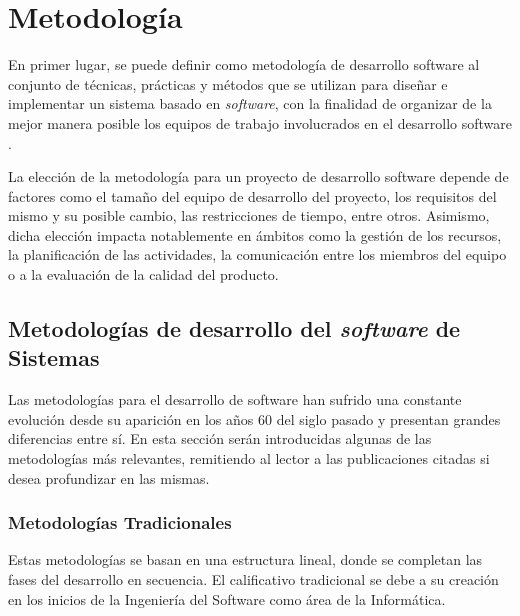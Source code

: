 \chapter{Metodología}
\label{chapter:metodologia}


En primer lugar, se puede definir como metodología de desarrollo software al conjunto de técnicas, prácticas y métodos que se utilizan para diseñar e implementar un sistema basado en \textit{software}, con la finalidad de organizar de la mejor manera posible los equipos de trabajo involucrados en el desarrollo software \cite{santander_universidades_metodologias_2020}.

La elección de la metodología para un proyecto de desarrollo software depende de factores como el tamaño del equipo de desarrollo del proyecto, los requisitos del mismo y su posible cambio, las restricciones de tiempo, entre otros. Asimismo, dicha elección impacta notablemente en ámbitos como la gestión de los recursos, la planificación de las actividades, la comunicación entre los miembros del equipo o a la evaluación de la calidad del producto.

\section{Metodologías de desarrollo del \textit{software} de Sistemas}

    Las metodologías para el desarrollo de software han sufrido una constante evolución desde su aparición en los años 60 del siglo pasado y presentan grandes diferencias entre sí. En esta sección serán introducidas algunas de las metodologías más relevantes, remitiendo al lector a las publicaciones citadas si desea profundizar en las mismas.

    \subsection{Metodologías Tradicionales}
    
        Estas metodologías se basan en una estructura lineal, donde se completan las fases del desarrollo en secuencia. El calificativo tradicional se debe a su creación en los inicios de la Ingeniería del Software como área de la Informática.
    
